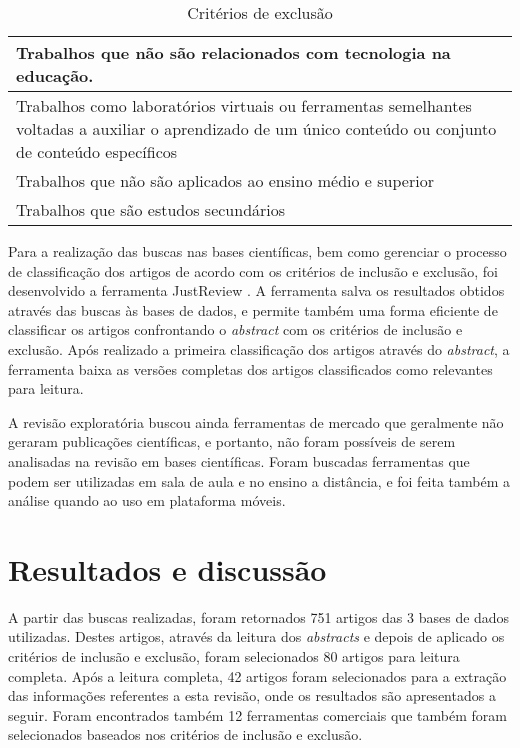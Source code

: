 \bgroup
\def\arraystretch{1.5} %
\begin{table}[h]{} %
\centering
\caption{Critérios de exclusão}
\begin{tabular}{ | p{14cm}| } \hline
Trabalhos que não são relacionados com tecnologia na educação. \\ \hline
Trabalhos como laboratórios virtuais ou ferramentas semelhantes voltadas a auxiliar o aprendizado de um único conteúdo ou conjunto de conteúdo específicos \\ \hline
Trabalhos que não são aplicados ao ensino médio e superior \\ \hline
Trabalhos que são estudos secundários \\ \hline
\end{tabular}
\label{tab:criteriosExclusao}
\end{table}
\egroup

Para a realização das buscas nas bases científicas, bem como gerenciar o processo de classificação dos artigos de acordo com os critérios de inclusão e exclusão, foi desenvolvido a ferramenta JustReview \cite{justreview_artigo}. A ferramenta salva os resultados obtidos através das buscas às bases de dados, e permite também uma forma eficiente de classificar os artigos confrontando o \emph{abstract} com os critérios de inclusão e exclusão. Após realizado a primeira classificação dos artigos através do \emph{abstract}, a ferramenta baixa as versões completas dos artigos classificados como relevantes para leitura.

A revisão exploratória buscou ainda ferramentas de mercado que geralmente não geraram publicações científicas, e portanto, não foram possíveis de serem analisadas na revisão em bases científicas. Foram buscadas ferramentas que podem ser utilizadas em sala de aula e no ensino a distância, e foi feita também a análise quando ao uso em plataforma móveis.

\section{Resultados e discussão}

A partir das buscas realizadas, foram retornados 751 artigos das 3 bases de dados utilizadas. Destes artigos, através da leitura dos \emph{abstracts} e depois de aplicado os critérios de inclusão e exclusão, foram selecionados 80 artigos para leitura completa. Após a leitura completa, 42 artigos foram selecionados para a extração das informações referentes a esta revisão, onde os resultados são apresentados a seguir. Foram encontrados também 12 ferramentas comerciais que também foram selecionados baseados nos critérios de inclusão e exclusão.

